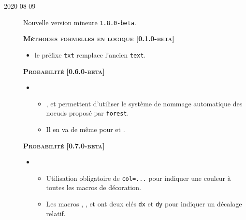 \documentclass[12pt,a4paper]{book}
\begin{document}
        \begin{description}
\medskip
\item[2020-08-09] Nouvelle version mineure \verb+1.8.0-beta+.




\begin{center}
    \textbf{\textsc{Méthodes formelles en logique [0.1.0-beta]}}
\end{center}

\begin{itemize}[itemsep=.5em]
    \item {}
          le préfixe \verb#txt# remplace l'ancien \verb#text#.
\end{itemize}


\separation




\begin{center}
    \textbf{\textsc{Probabilité [0.6.0-beta]}}
\end{center}

\begin{itemize}[itemsep=.5em]
    \item {}
    \begin{itemize}[itemsep=.5em]
        \item {},  et  permettent d'utiliser le système de nommage automatique des noeuds proposé par \verb#forest#.
        
        \item Il en va de même pour  et .
    \end{itemize}
\end{itemize}


\begin{center}
    \textbf{\textsc{Probabilité [0.7.0-beta]}}
\end{center}

\begin{itemize}[itemsep=.5em]
    \item {}
    \begin{itemize}[itemsep=.5em]
        \item Utilisation obligatoire de \verb#col=...# pour indiquer une couleur à toutes les macros de décoration.
        
        \item Les macros , , 
               et 
              ont deux clés \verb#dx# et \verb#dy# pour indiquer un décalage relatif.
        

\end{itemize}
\end{itemize}
\end{description}
\end{document}
